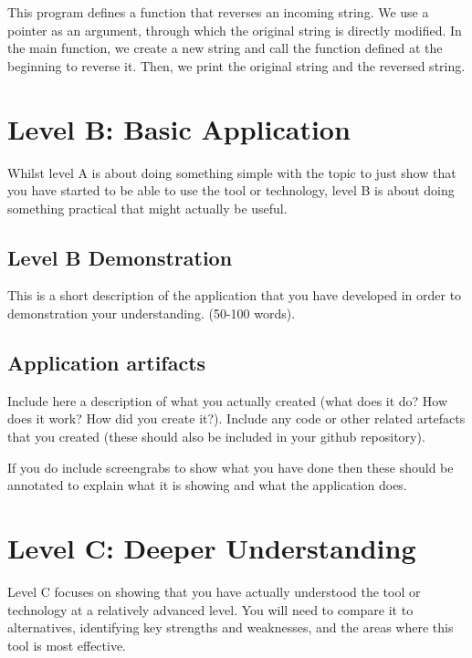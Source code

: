 \documentclass[a4paper, 11pt]{report}
\begin{document}
This program defines a function that reverses an incoming string. We use a pointer as an argument, through which the original string is directly modified. In the main function, we create a new string and call the function defined at the beginning to reverse it. Then, we print the original string and the reversed string.\\



\newpage
\section{Level B: Basic Application}

Whilst level A is about doing something simple with the topic to just show that you have started to be able to use the tool or technology, level B is about doing something practical that might actually be useful.

\subsection{Level B Demonstration}

This is a short description of the application that you have developed in order to demonstration your understanding. (50-100 words).

\subsection{Application artifacts}

Include here a description of what you actually created (what does it do? How does it work? How did you create it?). Include any code or other related artefacts that you created (these should also be included in your github repository).

If you do include screengrabs to show what you have done then these should be annotated to explain what it is showing and what the application does.



\newpage
\section{Level C: Deeper Understanding}

Level C focuses on showing that you have actually understood the tool or technology at a relatively advanced level. You will need to compare it to alternatives, identifying key strengths and weaknesses, and the areas where this tool is most effective. 
\end{document}

